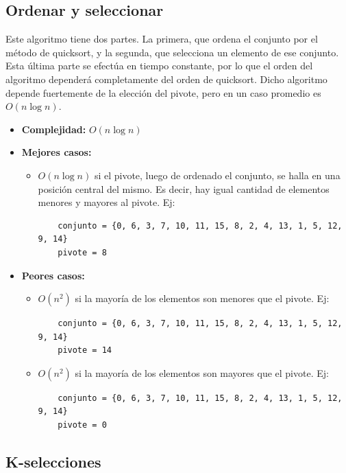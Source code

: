 \documentclass[a4paper,10pt]{article}
\begin{document}
\subsection{Ordenar y seleccionar}

Este algoritmo tiene dos partes. La primera, que ordena el conjunto por el método de quicksort, y la segunda, que selecciona un elemento de ese conjunto. Esta última parte se efectúa en tiempo constante, por lo que el orden del algoritmo dependerá completamente del orden de quicksort. Dicho algoritmo depende fuertemente de la elección del pivote, pero en un caso promedio es $O(n \log{n})$.

\begin{itemize}

\item \textbf{Complejidad:} $O(n \log{n})$
\item \textbf{Mejores casos:}
	\begin{itemize}
	\item $O(n \log{n})$ si el pivote, luego de ordenado el conjunto, se halla en una posición central del mismo. Es decir, hay igual cantidad de elementos menores y mayores al pivote. Ej:
	\begin{verbatim}
	conjunto = {0, 6, 3, 7, 10, 11, 15, 8, 2, 4, 13, 1, 5, 12, 9, 14}
	pivote = 8
	\end{verbatim}
	\end{itemize}
\item \textbf{Peores casos:}
	\begin{itemize}
	\item $O(n^2)$ si la mayoría de los elementos son menores que el pivote. Ej:
	\begin{verbatim}
	conjunto = {0, 6, 3, 7, 10, 11, 15, 8, 2, 4, 13, 1, 5, 12, 9, 14}
	pivote = 14
	\end{verbatim}
	\item $O(n^2)$ si la mayoría de los elementos son mayores que el pivote. Ej:
	\begin{verbatim}
	conjunto = {0, 6, 3, 7, 10, 11, 15, 8, 2, 4, 13, 1, 5, 12, 9, 14}
	pivote = 0
	\end{verbatim}
	\end{itemize}

\end{itemize}

\subsection{K-selecciones}
\end{document}
